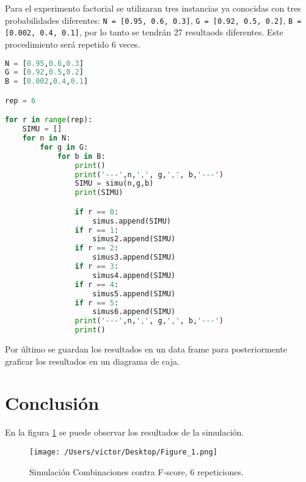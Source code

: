 \documentclass{article}
\begin{document}
Para el experimento factorial se utilizaran tres instancias ya conocidas con tres probabilidades diferentes: \texttt{N = [0.95, 0.6, 0.3]}, \texttt{G = [0.92, 0.5, 0.2]}, \texttt{B = [0.002, 0.4, 0.1]}, por lo tanto se tendrán 27 resultaods diferentes. Este procedimiento será repetido 6 veces.\\

\begin{lstlisting}[language=Python]
N = [0.95,0.6,0.3]
G = [0.92,0.5,0.2]
B = [0.002,0.4,0.1]

rep = 6

for r in range(rep):
    SIMU = []
    for n in N:
        for g in G:
            for b in B:
                print()
                print('---',n,',', g,',', b,'---')
                SIMU = simu(n,g,b)
                print(SIMU)

                if r == 0:
                    simus.append(SIMU)
                if r == 1:
                    simus2.append(SIMU)
                if r == 2:
                    simus3.append(SIMU)
                if r == 3:
                    simus4.append(SIMU)
                if r == 4:
                    simus5.append(SIMU)
                if r == 5:
                    simus6.append(SIMU)
                print('---',n,',', g,',', b,'---')
                print()
\end{lstlisting}

Por último se guardan los resultados en un data frame para posteriormente graficar los resultados en un diagrama de caja.\\ 
\section{Conclusión}

En la figura \ref{f1} se puede observar los resultados de la simulación. 

\begin{figure}[H]
\begin{center}
	\texttt{[image: /Users/victor/Desktop/Figure\_1.png]}
	\caption{ Simulación Combinaciones contra F-score, 6 repeticiones.}
	\label{f1}
\end{center}
\end{figure}
\end{document}
